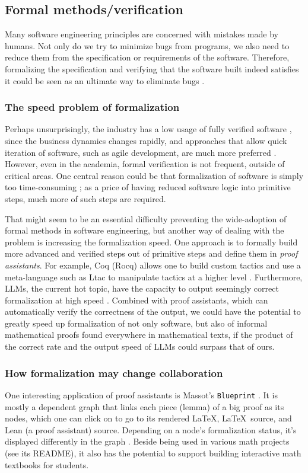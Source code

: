 \documentclass[10pt]{article}
\begin{document}
\subsection{Formal methods/verification}
Many software engineering principles are concerned with mistakes made by
humans. Not only do we try to minimize bugs from programs, we also need to
reduce them from the specification or requirements of the software.  Therefore,
formalizing the specification and verifying that the software built indeed
satisfies it could be seen as an ultimate way to eliminate bugs
\cite{hoare.axiomatic.prog}. 

\subsubsection{The speed problem of formalization}
Perhaps unsurprisingly, the industry has a low usage of fully verified software
\cite{formal.methods.underuse}, since the business dynamics changes rapidly,
and approaches that allow quick iteration of software, such as agile
development, are much more preferred \cite{agile.se}. However, even in the
academia, formal verification is not frequent, outside of critical areas. One
central reason could be that formalization of software is simply too
time-consuming \cite{formal.methods.underuse}; as a price of having reduced
software logic into primitive steps, much more of such steps are required.

That might seem to be an essential difficulty preventing the wide-adoption of
formal methods in software engineering, but another way of dealing with the
problem is increasing the formalization speed. One approach is to formally build
more advanced and verified steps out of primitive steps and define them in
\emph{proof assistants}. For example, Coq (Rocq) allows one to build custom
tactics and use a meta-language such as Ltac to manipulate tactics at a higher
level \cite{coq.manual}. Furthermore, LLMs, the current hot topic, have the
capacity to output seemingly correct formalization at high speed
\cite{llm.gen.proof}.  Combined with proof assistants, which can automatically
verify the correctness of the output, we could have the potential to greatly
speed up formalization of not only software, but also of informal mathematical
proofs found everywhere in mathematical texts, if the product of the correct
rate and the output speed of LLMs could surpass that of ours.

\subsubsection{How formalization may change collaboration}
One interesting application of proof assistants is Massot's \texttt{Blueprint}
\cite{massot.blueprint}. It is mostly a dependent graph that links each piece
(lemma) of a big proof as its nodes, which one can click on to go to its
rendered \LaTeX, \LaTeX\ source, and Lean (a proof assistant) source. Depending
on a node's formalization status, it's displayed differently in the graph
\cite{tao.blueprint.post}. Beside being used in various math projects (see its
README), it also has the potential to support building interactive math
textbooks for students.
\end{document}
